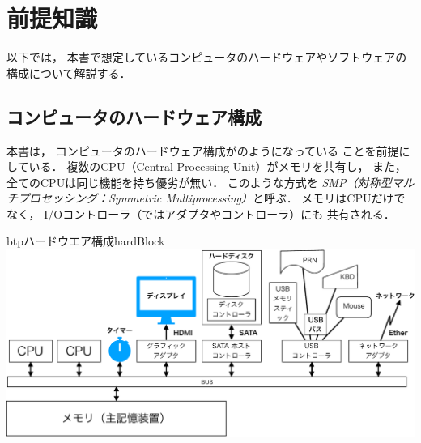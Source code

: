 \chapter{前提知識}
以下では，
本書で想定しているコンピュータのハードウェアやソフトウェアの
構成について解説する．

\section{コンピュータのハードウェア構成}
本書は，
コンピュータのハードウェア構成がのようになっている
ことを前提にしている．
複数のCPU（Central Processing Unit）がメモリを共有し，
また，全てのCPUは同じ機能を持ち優劣が無い．
このような方式を
\emph{SMP（対称型マルチプロセッシング：Symmetric Multiprocessing）}と呼ぶ．
メモリはCPUだけでなく，
I/Oコントローラ（ではアダプタやコントローラ）にも
共有される．

\begin{myfig}{btp}{ハードウエア構成}{hardBlock}
  \includegraphics[scale=0.55]{Fig/hardBlock-crop.pdf}
\end{myfig}


